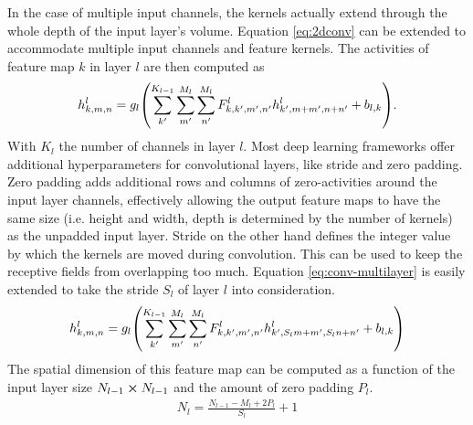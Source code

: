 In the case of multiple input channels, the kernels actually extend through the whole depth of the input layer's volume. Equation \ref{eq:2dconv} can be extended to accommodate multiple input channels and feature kernels. The activities of feature map $k$ in layer $l$ are then computed as
\begin{align}
    h^l_{k,m,n} = g_l\qty(\sum_{k'}^{K_{l-1}}\sum_{m'}^{M_l}\sum_{n'}^{M_l}F_{k,k',m',n'}^l h_{k',m+m',n+n'}^l+b_{l,k}).
    \label{eq:conv-multilayer}
\end{align}
With $K_l$ the number of channels in layer $l$. Most deep learning frameworks offer additional hyperparameters for convolutional layers, like stride and zero padding. Zero padding adds additional rows and columns of zero-activities around the input layer channels, effectively allowing the output feature maps to have the same size (i.e. height and width, depth is determined by the number of kernels) as the unpadded input layer. Stride on the other hand defines the integer value by which the kernels are moved during convolution. This can be used to keep the receptive fields from overlapping too much. Equation \ref{eq:conv-multilayer} is easily extended to take the stride $S_l$ of layer $l$ into consideration.
\begin{align}
    h^l_{k,m,n} = g_l\qty(\sum_{k'}^{K_{l-1}}\sum_{m'}^{M_l}\sum_{n'}^{M_l}F_{k,k',m',n'}^l h_{k',S_l m+m',S_l n+n'}^l+b_{l,k})
\end{align}
The spatial dimension of this feature map can be computed as a function of the input layer size $N_{l-1}\cp N_{l-1}$ and the amount of zero padding $P_l$.
\begin{align}
    N_l = \frac{N_{l-1}-M_l+2P_l}{S_l}+1
\end{align}
